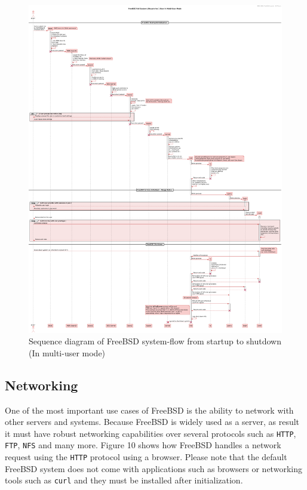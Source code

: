 \documentclass[12pt, dvipsnames, a4paper]{article}
\newcommand{\code}[1]{\texttt{#1}}
\begin{document}
\begin{figure}[!htb]
	\advance\leftskip-0.5cm
	\includegraphics[width = 570pt]{assets/sequence_diagrams/system-flow.pdf}
	\caption{Sequence diagram of FreeBSD system-flow from startup to shutdown (In multi-user mode) \cite{bootprocess}\cite{init}\cite{getty}\cite{login}}
\end{figure}
\clearpage

\subsection{Networking}
One of the most important use cases of FreeBSD is the ability to network with other servers and systems. Because FreeBSD is
widely used as a server, as result it must have robust networking capabilities over several protocols such as \code{HTTP}, \code{FTP}, \code{NFS} and many more.
Figure 10 shows how FreeBSD handles a network request using the \code{HTTP} protocol using a browser. Please note that the default FreeBSD system
does not come with applications such as browsers or networking tools such as \code{curl} and they must be installed after initialization.
\end{document}
